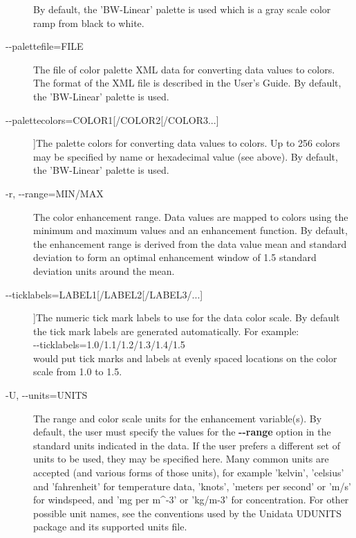 \begin{description}
\begin{verbatim}
\end{verbatim}
 By default, the 'BW-Linear' palette is used which is a gray scale color ramp from black to white.
\item[-{-}palettefile=FILE]The file of color palette XML data for converting data values to colors. The format of the XML file is described in the User's Guide. By default, the 'BW-Linear' palette is used.
\item[-{-}palettecolors=COLOR1[/COLOR2[/COLOR3...{]}]]The palette colors for converting data values to colors. Up to 256 colors may be specified by name or hexadecimal value (see above). By default, the 'BW-Linear' palette is used.
\item[-r, -{-}range=MIN/MAX]The color enhancement range. Data values are mapped to colors using the minimum and maximum values and an enhancement function. By default, the enhancement range is derived from the data value mean and standard deviation to form an optimal enhancement window of 1.5 standard deviation units around the mean.
\item[-{-}ticklabels=LABEL1[/LABEL2[/LABEL3/...{]}]]The numeric tick mark labels to use for the data color scale. By default the tick mark labels are generated automatically. For example:\\ 
 -{-}ticklabels=1.0/1.1/1.2/1.3/1.4/1.5\\ 
would put tick marks and labels at evenly spaced locations on the color scale from 1.0 to 1.5.
\item[-U, -{-}units=UNITS]The range and color scale units for the enhancement variable(s). By default, the user must specify the values for the \textbf{-{-}range}
 option in the standard units indicated in the data. If the user prefers a different set of units to be used, they may be specified here. Many common units are accepted (and various forms of those units), for example 'kelvin', 'celsius' and 'fahrenheit' for temperature data, 'knots', 'meters per second' or 'm/s' for windspeed, and 'mg per m\^{}-3' or 'kg/m-3' for concentration. For other possible unit names, see the conventions used by the Unidata UDUNITS package and its supported units file.

\end{description}
